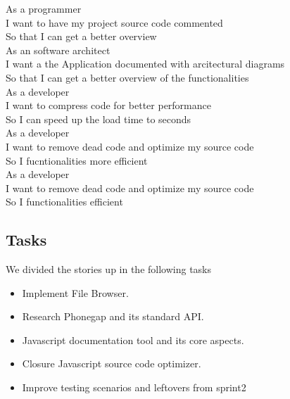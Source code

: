 As a programmer\\
I want to have my project source code commented  \\
So that I can get a better overview \\

As an software architect\\
I want a the Application documented with arcitectural diagrams \\
So that I can get a better overview of the functionalities\\

As a developer\\
I want to compress code for better performance\\
So I can speed up the load time to seconds\\

As a developer\\
I want to remove dead code and optimize my source code\\
So I fucntionalities more efficient\\

As a developer\\
I want to remove dead code and optimize my source code\\
So I functionalities efficient\\


\subsection{Tasks} %
\label{sub:Tasks}
We divided the stories up in the following tasks
\begin{itemize}
	\item Implement File Browser.
	\item Research Phonegap and its standard API.
	\item Javascript documentation tool and its core aspects.
	\item Closure Javascript source code optimizer.
	\item Improve testing scenarios and leftovers from sprint2
\end{itemize}










